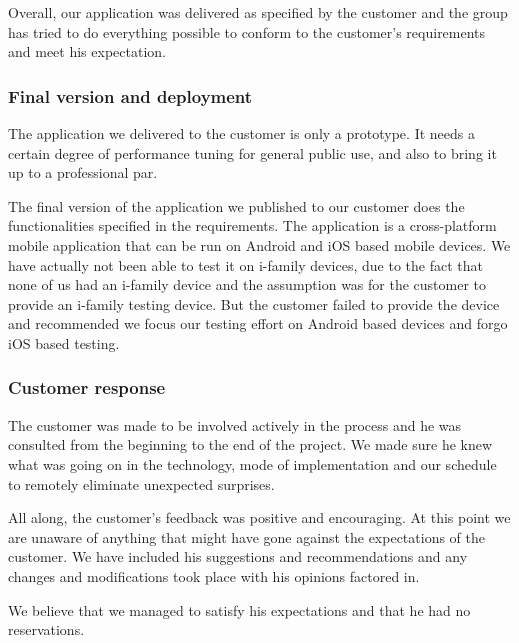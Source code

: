     Overall, our application was delivered as specified by the customer and the group has tried to do everything possible to conform to the customer's requirements and meet his expectation.
	\subsubsection{Final version and deployment}
The application we delivered to the customer is only a prototype. It needs a certain degree of performance tuning for general public use, and also to bring it up to a professional par.

The final version of the application we published to our customer does the functionalities specified in the requirements. The application is a cross-platform mobile application that can be run on Android and iOS based mobile devices. We have actually not been able to test it on i-family devices, due to the fact that none of us had an i-family device and the assumption was for the customer to provide an i-family testing device. But the customer failed to provide the device and recommended we focus our testing effort on Android based devices and forgo iOS based testing.



	\subsubsection{Customer response}
The customer was made to be involved actively in the process and he was consulted from the beginning to the end of the project. We made sure he knew what was going on in the technology, mode of implementation and our schedule to remotely eliminate unexpected surprises.

All along, the customer's feedback was positive and encouraging. At this point we are unaware of anything that might have gone against the expectations of the customer.
We have included his suggestions and recommendations and any changes and modifications took place with his opinions factored in.

We believe that we managed to satisfy his expectations and that he had no reservations.
	


